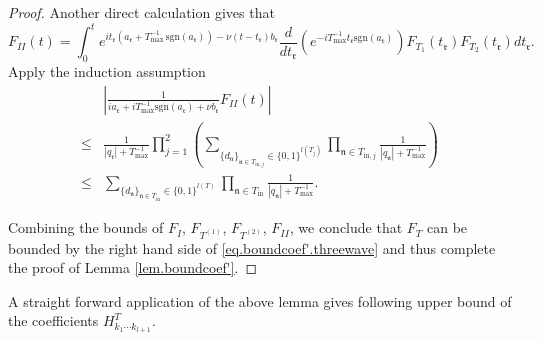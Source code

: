 \begin{proof}
Another direct calculation gives that 
\begin{equation}
    F_{II}(t)=\int^t_0  e^{it_{\mathfrak{r}}(a_{\mathfrak{r}}+T^{-1}_{\text{max}}\, \text{sgn}(a_{\mathfrak{r}}))- \nu(t-t_{\mathfrak{r}})b_{\mathfrak{r}}} \frac{d}{dt_{\mathfrak{r}}}(e^{-iT^{-1}_{\text{max}}t_{\mathfrak{r}} \text{sgn}(a_{\mathfrak{r}})})  F_{T_1}(t_{\mathfrak{r}})F_{T_2}(t_{\mathfrak{r}}) dt_{\mathfrak{r}}.
\end{equation}
Apply the induction assumption
\begin{equation}
\begin{split}
    &\left| \frac{1}{ia_{\mathfrak{r}}+iT^{-1}_{\text{max}} \text{sgn}(a_{\mathfrak{r}})+\nu b_{\mathfrak{r}} } F_{II}(t)\right|
    \\
    \le& \frac{1}{|q_{\mathfrak{r}}|+T^{-1}_{\text{max}}}\prod_{j=1}^2\left(\sum_{\{d_{\mathfrak{n}}\}_{\mathfrak{n}\in T_{\text{in},j}}\in\{0,1\}^{l(T_j)}}\prod_{\mathfrak{n}\in T_{\text{in},j}}\frac{1}{|q_{\mathfrak{n}}|+T^{-1}_{\text{max}}}\right)
    \\
    \le& \sum_{\{d_{\mathfrak{n}}\}_{\mathfrak{n}\in T_{\text{in}}}\in\{0,1\}^{l(T)}}\prod_{\mathfrak{n}\in T_{\text{in}}}\frac{1}{|q_{\mathfrak{n}}|+T^{-1}_{\text{max}}}.
\end{split}
\end{equation}

Combining the bounds of $F_{I}$, $F_{T^{(1)}}$, $F_{T^{(2)}}$, $F_{II}$, we conclude that $F_T$ can be bounded by the right hand side of \eqref{eq.boundcoef'.threewave} and thus complete the proof of Lemma \ref{lem.boundcoef'}.
\end{proof}
 





A straight forward application of the above lemma gives following upper bound of the coefficients $H^T_{k_1\cdots k_{l+1}}$. 

